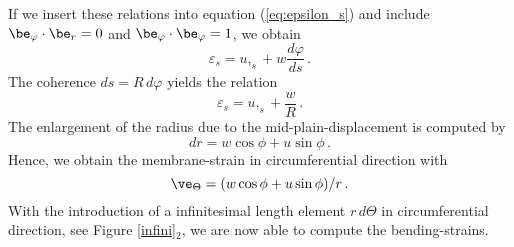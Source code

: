 If we insert these relations into equation (\ref{eq:epsilon_s}) 
and include $\be_\varphi \cdot \be_r = 0$ and 
$\be_\varphi \cdot \be_\varphi = 1$, we obtain 
\begin{equation}
\varepsilon_s = u,_s + w \frac{d \varphi}{ds} \, .
\end{equation}
The coherence $ds = R\,d \varphi$ yields the relation
\begin{equation}
\varepsilon_s = u,_s + \dfrac{w}{R} \, .
\end{equation}
The enlargement of the radius due to the mid-plain-displacement 
is computed by 
\begin{equation}
dr = w \cos \phi + u \sin \phi \, . 
\end{equation}
Hence, we obtain the membrane-strain in circumferential 
direction with 
\begin{equation}
\ve_\Theta = (w \cos \phi + u \sin \phi) / r \, .
\end{equation}
With the introduction of a infinitesimal length element 
$r\, d \Theta$ in circumferential direction, 
see Figure \ref{infini}$_2$, 
we are now able to compute the bending-strains. 

